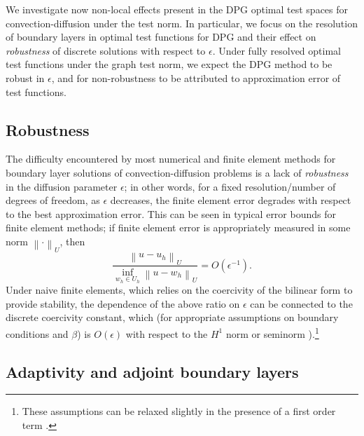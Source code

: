 \documentclass[11pt,onecolumn]{scrartcl}
\newcommand{\nor}[1]{\left\| #1 \right\|}
\begin{document}
We investigate now non-local effects present in the DPG optimal test spaces for convection-diffusion under the test norm.  In particular, we focus on the resolution of boundary layers in optimal test functions for DPG and their effect on \textit{robustness} of discrete solutions with respect to $\epsilon$. Under fully resolved optimal test functions under the graph test norm, we expect the DPG method to be robust in $\epsilon$, and for non-robustness to be attributed to approximation error of test functions.  


\subsection{Robustness}
\label{sec:robust}
The difficulty encountered by most numerical and finite element methods for boundary layer solutions of convection-diffusion problems is a lack of \textit{robustness} in the diffusion parameter $\epsilon$; in other words, for a fixed resolution/number of degrees of freedom, as $\epsilon$ decreases, the finite element error degrades with respect to the best approximation error.  This can be seen in typical error bounds for finite element methods; if finite element error is appropriately measured in some norm $\nor{\cdot}_U$, then
\[
\frac{\nor{u-u_h}_U}{\inf_{w_h\in U_h}\nor{u-w_h}_U} = O(\epsilon^{-1}).
\]
Under naive finite elements, which relies on the coercivity of the bilinear form to provide stability, the dependence of the above ratio on $\epsilon$ can be connected to the discrete coercivity constant, which (for appropriate assumptions on boundary conditions and $\beta$) is $O(\epsilon)$ with respect to the $H^1$ norm or seminorm \cite{roos2008robust}).\footnote{These assumptions can be relaxed slightly in the presence of a first order term \cite{stynesSUPG}.}

\subsection{Adaptivity and adjoint boundary layers}

\end{document}
